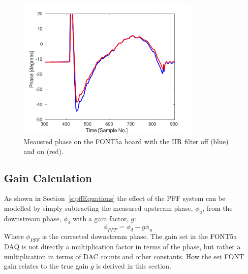 \begin{figure}
  \centering
  \includegraphics[width=0.8\textwidth]{Figures/commissioning/iirPhaseFiltOffOn}
  \caption{Meausred phase on the FONT5a board with the IIR filter off (blue) and on (red).}
  \label{f:iirPhasefiltOffOn}
\end{figure}


\subsection{Gain Calculation}
\label{ss:fontGain}

As shown in Section~\ref{s:pffEquations} the effect of the PFF system can be modelled by simply subtracting the measured upstream phase, \(\phi_u\), from the downstream phase, \(\phi_d\) with a gain factor, \(g\):
\begin{equation} \label{e:realGainEqn}
\phi_{PFF} = \phi_d - g\phi_u
\end{equation}
Where \(\phi_{PFF}\) is the corrected downstream phase. The gain set in the FONT5a DAQ is not directly a multiplication factor in terms of the phase, but rather a multiplication in terms of DAC counts and other constants. How the set FONT gain relates to the true gain \(g\) is derived in this section.

